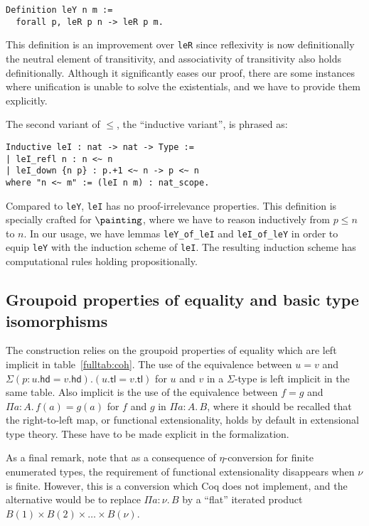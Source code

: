 \documentclass{msc}
\newcommand{\tl}{\ensuremath{\mathsf{tl}}}
\newcommand{\hd}{\ensuremath{\mathsf{hd}}}
\begin{document}
\begin{verbatim}
Definition leY n m :=
  forall p, leR p n -> leR p m.
\end{verbatim}

This definition is an improvement over \texttt{leR} since reflexivity is now definitionally the neutral element of transitivity, and associativity of transitivity also holds definitionally. Although it significantly eases our proof, there are some instances where unification is unable to solve the existentials, and we have to provide them explicitly.

The second variant of $\leq$, the ``inductive variant'', is phrased as:

\begin{verbatim}
Inductive leI : nat -> nat -> Type :=
| leI_refl n : n <~ n
| leI_down {n p} : p.+1 <~ n -> p <~ n
where "n <~ m" := (leI n m) : nat_scope.
\end{verbatim}

Compared to \texttt{leY}, \texttt{leI} has no proof-irrelevance properties. This definition is specially crafted for $\painting$, where we have to reason inductively from $p \leq n$ to $n$. In our usage, we have lemmas \texttt{leY\_of\_leI} and \texttt{leI\_of\_leY} in order to equip \texttt{leY} with the induction scheme of \texttt{leI}. The resulting induction scheme has computational rules holding propositionally.

\subsection{Groupoid properties of equality and basic type isomorphisms\label{sec:eqproperties}}
The construction relies on the groupoid properties of equality which are left implicit in table~\ref{fulltab:coh}. The use of the equivalence between $u = v$ and $\Sigma (p:u.\hd = v.\hd). (u.\tl = v.\tl)$ for $u$ and $v$ in a $\Sigma$-type is left implicit in the same table. Also implicit is the use of the equivalence between $f = g$ and $\Pi a: A.\, f(a) = g(a)$ for $f$ and $g$ in $\Pi a: A.\, B$, where it should be recalled that the right-to-left map, or functional extensionality, holds by default in extensional type theory. These have to be made explicit in the formalization.

As a final remark, note that as a consequence of $\eta$-conversion for finite enumerated types, the requirement of functional extensionality disappears when $\nu$ is finite. However, this is a conversion which Coq does not implement, and the alternative would be to replace $\Pi a: \nu.\, B$ by a ``flat'' iterated product $B(1) \times B(2) \times \ldots \times B(\nu)$.
\end{document}
